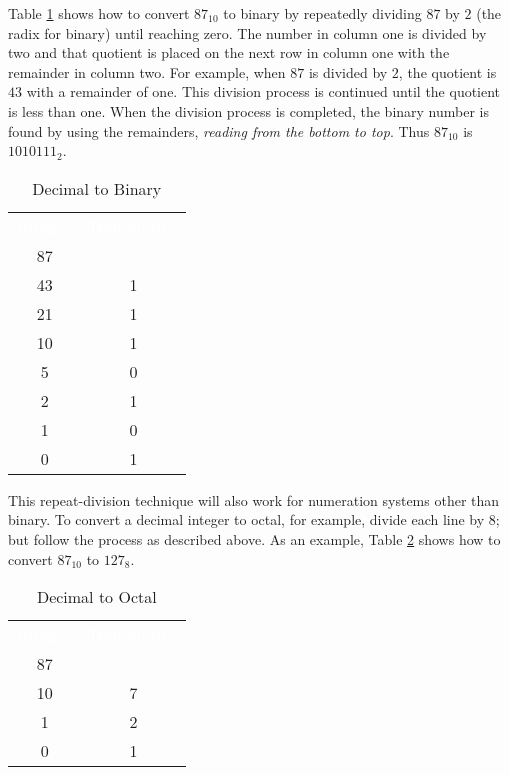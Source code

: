 Table \ref{MF:tab:dec_to_bin_integer} shows how to convert $ 87_{10} $ to binary by repeatedly dividing $ 87 $ by $ 2 $ (the radix for binary) until reaching zero. The number in column one is divided by two and that quotient is placed on the next row in column one with the remainder in column two. For example, when $ 87 $ is divided by $ 2 $, the quotient is $ 43 $ with a remainder of one. This division process is continued until the quotient is less than one. When the division process is completed, the binary number is found by using the remainders, \emph{reading from the bottom to top}. Thus $ 87_{10} $ is $ 1010111_2 $.

\begin{table}[H]
  \sffamily
  \newcommand{\head}[1]{\textcolor{white}{\textbf{#1}}}    
  \begin{center}
    \begin{tabular}{ c c } 
      \hline
      \rowcolor{black!75}
      \head{Integer} & \head{Remainder} \\
      87 &  \\
      43 & 1 \\
      21 & 1 \\
      10 & 1 \\
      5 & 0 \\
      2 & 1 \\
      1 & 0 \\
      0 & 1 \\ \hline
    \end{tabular}
  \end{center}
  \caption{Decimal to Binary}
  \label{MF:tab:dec_to_bin_integer}
\end{table}

This repeat-division technique will also work for numeration systems other than binary. To convert a decimal integer to octal, for example, divide each line by $ 8 $; but follow the process as described above. As an example, Table \ref{MF:tab:dec_to_oct} shows how to convert $ 87_{10} $ to $ 127_8 $.

\begin{table}[H]
  \sffamily
  \newcommand{\head}[1]{\textcolor{white}{\textbf{#1}}}    
  \begin{center}
    \begin{tabular}{ c c } 
      \hline
      \rowcolor{black!75}
      \head{Integer} & \head{Remainder} \\
      87 &  \\
      10 & 7 \\
      1 & 2 \\
      0 & 1 \\ \hline
    \end{tabular}
  \end{center}
  \caption{Decimal to Octal}
  \label{MF:tab:dec_to_oct}
\end{table}

